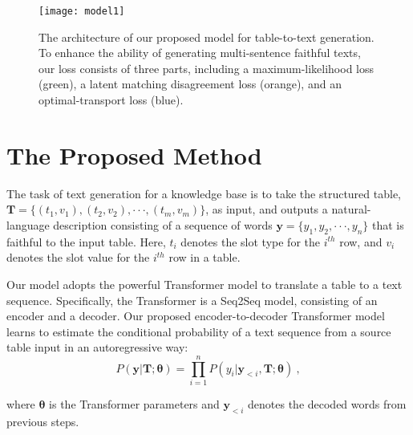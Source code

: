 \documentclass[11pt,a4paper]{article}
\begin{document}
\begin{figure}[!t]
    \centering
    \texttt{[image: model1]}
    \vspace{-0.6cm}
    \caption{The architecture of our proposed model for table-to-text generation. To enhance the ability of generating multi-sentence faithful texts, our loss consists of three parts, including a maximum-likelihood loss (green), a latent matching disagreement loss (orange), and an optimal-transport loss (blue).}
    \label{fig:architecture}
    \vspace{-0.5cm}
\end{figure}


\section{The Proposed Method}

The task of text generation for a knowledge base is to take the structured table, $\bm{T} = \{(t_1, v_1),(t_2, v_2), · · · ,(t_m, v_m) \}$, as
input, and outputs a natural-language description consisting of a sequence of words $\bm{y} =
\{y_1, y_2, · · · , y_n\}$ that is faithful to the input table. Here, $t_i$ denotes the slot type for the $i^{th}$ row, and $v_i$ denotes the slot value for the $i^{th}$ row in a table.

Our model adopts the powerful Transformer model \cite{Vaswani2017} to translate a table to a text sequence. Specifically, the Transformer is a Seq2Seq model, consisting of an encoder and a decoder. Our proposed encoder-to-decoder Transformer model learns to estimate the conditional probability of a text sequence from a source table input in an autoregressive way:
\vspace{-0.3cm}
\begin{equation} \label{eq:mle}
    P(\bm{y}|\bm{T}; \bm{\theta}) = \prod_{i=1}^n P(y_i|\bm{y}_{< i}, \bm{T}; \bm{\theta})~,
\end{equation}\par\vspace{-0.2cm}
\noindent where $\bm{\theta}$ is the Transformer parameters and $\bm{y}_{< i}$ denotes the decoded words from previous steps. 
\end{document}
